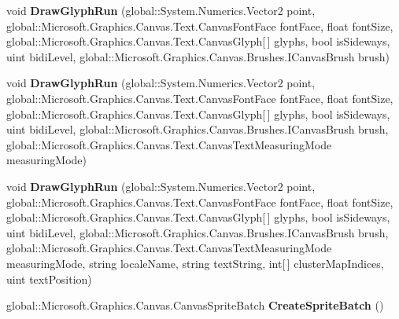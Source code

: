 \begin{DoxyCompactItemize}
void {\bfseries Draw\+Glyph\+Run} (global\+::\+System.\+Numerics.\+Vector2 point, global\+::\+Microsoft.\+Graphics.\+Canvas.\+Text.\+Canvas\+Font\+Face font\+Face, float font\+Size, global\+::\+Microsoft.\+Graphics.\+Canvas.\+Text.\+Canvas\+Glyph\mbox{[}$\,$\mbox{]} glyphs, bool is\+Sideways, uint bidi\+Level, global\+::\+Microsoft.\+Graphics.\+Canvas.\+Brushes.\+I\+Canvas\+Brush brush)
\item 
\mbox{\label{class_microsoft_1_1_graphics_1_1_canvas_1_1_canvas_drawing_session_a1f17bbace877bf9a592016a5c88d9f49}} 
void {\bfseries Draw\+Glyph\+Run} (global\+::\+System.\+Numerics.\+Vector2 point, global\+::\+Microsoft.\+Graphics.\+Canvas.\+Text.\+Canvas\+Font\+Face font\+Face, float font\+Size, global\+::\+Microsoft.\+Graphics.\+Canvas.\+Text.\+Canvas\+Glyph\mbox{[}$\,$\mbox{]} glyphs, bool is\+Sideways, uint bidi\+Level, global\+::\+Microsoft.\+Graphics.\+Canvas.\+Brushes.\+I\+Canvas\+Brush brush, global\+::\+Microsoft.\+Graphics.\+Canvas.\+Text.\+Canvas\+Text\+Measuring\+Mode measuring\+Mode)
\item 
\mbox{\label{class_microsoft_1_1_graphics_1_1_canvas_1_1_canvas_drawing_session_a7141cc7174254e70e51c28b9e7c914bf}} 
void {\bfseries Draw\+Glyph\+Run} (global\+::\+System.\+Numerics.\+Vector2 point, global\+::\+Microsoft.\+Graphics.\+Canvas.\+Text.\+Canvas\+Font\+Face font\+Face, float font\+Size, global\+::\+Microsoft.\+Graphics.\+Canvas.\+Text.\+Canvas\+Glyph\mbox{[}$\,$\mbox{]} glyphs, bool is\+Sideways, uint bidi\+Level, global\+::\+Microsoft.\+Graphics.\+Canvas.\+Brushes.\+I\+Canvas\+Brush brush, global\+::\+Microsoft.\+Graphics.\+Canvas.\+Text.\+Canvas\+Text\+Measuring\+Mode measuring\+Mode, string locale\+Name, string text\+String, int\mbox{[}$\,$\mbox{]} cluster\+Map\+Indices, uint text\+Position)
\item 
\mbox{\label{class_microsoft_1_1_graphics_1_1_canvas_1_1_canvas_drawing_session_a1538a697e0b86bca6f7c150533eb5171}} 
global\+::\+Microsoft.\+Graphics.\+Canvas.\+Canvas\+Sprite\+Batch {\bfseries Create\+Sprite\+Batch} ()
\item 
\mbox{\label{class_microsoft_1_1_graphics_1_1_canvas_1_1_canvas_drawing_session_a2a90318aeea5371614e41e51b53a0a02}} 

\end{DoxyCompactItemize}
